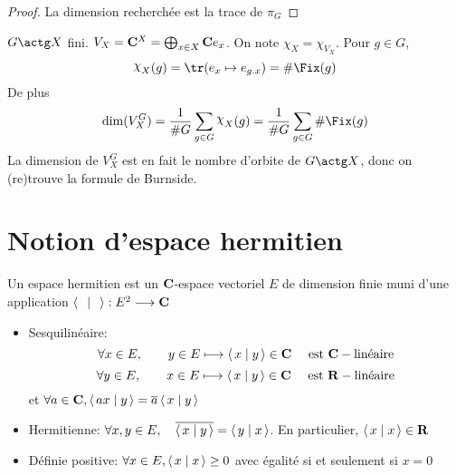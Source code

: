 \begin{proof}
La dimension recherchée est la trace de $\pi_G$
\end{proof}

\begin{ex}
$G\actg X$ fini.  $V_X=\mathbf C^X=\bigoplus_{x \in  X}\mathbf C e_x$. On note $\chi_X=\chi_{V_X}$. Pour $g \in  G$, \[
    \chi_X(g)=\tr(e_x\mapsto e_{g.x})=\# \Fix(g)
\] 
De plus \[
    \dim (V_X^G)=\frac1{\#G}\sum_{g \in  G}\chi_X(g)=\frac1{\#G}\sum_{g \in  G}\#\Fix(g)
\] 
La dimension de $V_X^G$ est en fait le nombre d'orbite de  $G\actg X$, donc on (re)trouve la formule de Burnside.
\end{ex}

\section{Notion d'espace hermitien}

\begin{dfn}
Un espace hermitien est un $ \mathbf C$-espace vectoriel $E$ de dimension finie muni d'une application  $\scalar{\;}{\;} : E^2 \longrightarrow \C$ \begin{itemize}
    \item Sesquilinéaire: \[
            \forall  x \in  E, \qquad  y \in  E \longmapsto \scalar{x}{y} \in  \C \quad \text{ est  }\C-\text{linéaire}
    \] 
    \[
            \forall  y \in  E, \qquad  x \in  E \longmapsto \scalar{x}{y} \in  \C \quad \text{ est  }\R-\text{linéaire}
    \] 
    et $\forall  a \in  \C, \scalar{ax}{y} = \bar{a} \scalar{x}{y} $ 
    \item Hermitienne: $\forall  x, y \in E, \quad  \bar{\scalar{x}{y} }= \scalar{y}{x} $. En particulier, $\scalar{x}{x} \in  \R$
    \item Définie positive: $\forall  x \in  E, \scalar{x}{x} \geq 0$ avec égalité si et seulement si $x=0$
\end{itemize}
\end{dfn}

